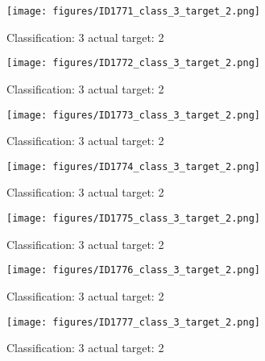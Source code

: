 \begin{figure}[h!]
\begin{center}
\texttt{[image: figures/ID1771\_class\_3\_target\_2.png]}
\end{center}
\caption{ Classification: 3 actual target: 2}
\label{fig:ID1771_class_3_target_2}
\end{figure}
\begin{figure}[h!]
\begin{center}
\texttt{[image: figures/ID1772\_class\_3\_target\_2.png]}
\end{center}
\caption{ Classification: 3 actual target: 2}
\label{fig:ID1772_class_3_target_2}
\end{figure}
\begin{figure}[h!]
\begin{center}
\texttt{[image: figures/ID1773\_class\_3\_target\_2.png]}
\end{center}
\caption{ Classification: 3 actual target: 2}
\label{fig:ID1773_class_3_target_2}
\end{figure}
\begin{figure}[h!]
\begin{center}
\texttt{[image: figures/ID1774\_class\_3\_target\_2.png]}
\end{center}
\caption{ Classification: 3 actual target: 2}
\label{fig:ID1774_class_3_target_2}
\end{figure}
\begin{figure}[h!]
\begin{center}
\texttt{[image: figures/ID1775\_class\_3\_target\_2.png]}
\end{center}
\caption{ Classification: 3 actual target: 2}
\label{fig:ID1775_class_3_target_2}
\end{figure}
\begin{figure}[h!]
\begin{center}
\texttt{[image: figures/ID1776\_class\_3\_target\_2.png]}
\end{center}
\caption{ Classification: 3 actual target: 2}
\label{fig:ID1776_class_3_target_2}
\end{figure}
\begin{figure}[h!]
\begin{center}
\texttt{[image: figures/ID1777\_class\_3\_target\_2.png]}
\end{center}
\caption{ Classification: 3 actual target: 2}
\label{fig:ID1777_class_3_target_2}
\end{figure}
